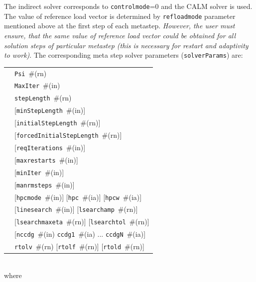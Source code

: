 \documentclass[a4paper]{article}
\makeatletter
\newcommand{\param}[1]{\texttt{#1}} %
\newcommand{\optional}[1]{[#1]} %
\newcommand{\field}[2]{\param{#1}~\#{\tiny(#2)}} %
\newcommand{\optField}[2]{\optional{\field{#1}{#2}}}
\newenvironment{record}[1][]{\begin{tabular}{|ll}}{\end{tabular}\\}
\newcommand{\recentry}[2]{{#1}&{#2}\\}
\newcounter{rcc}
\newenvironment{record}[1][\textwidth]{\setcounter{rcc}{0}\begin{tabular*}{#1}{|ll@{\extracolsep{\fill}}r}}{\end{tabular*}\\}
\newcommand{\recentry}[2]{\ifthenelse{\value{rcc}>0}{&$\backslash$ \\}{\setcounter{rcc}{1}}{#1}&{#2}}
\makeatother
\begin{document}
The indirect solver corresponds to \param{controlmode}=0 and the CALM
solver is used. The value of reference load vector is determined by
\param{refloadmode} parameter mentioned above at the first step of
each metastep. {\em However, the user must ensure, that the same value of
reference load vector could be obtained for all solution steps of
particular metastep (this is necessary for restart and adaptivity to work)}.
The corresponding meta step solver parameters (\param{solverParams}) are:\\
\begin{record}
  \recentry{\hspace{10mm}}{\field{Psi}{rn}}
  \recentry{}{\field{MaxIter}{in}}
  \recentry{}{\field{stepLength}{rn}}
  \recentry{}{\optField{min\-Step\-Le\-ngth}{in}}
  \recentry{}{\optField{initialStepLength}{rn}}
  \recentry{}{\optField{forcedInitialStepLength}{rn}}
  \recentry{}{\optField{reqIterations}{in}}
  \recentry{}{\optField{maxrestarts}{in}}
  \recentry{}{\optField{minIter}{in}}
  \recentry{}{\optField{manrmsteps}{in}}
  \recentry{}{\optField{hpcmode}{in} \optField{hpc}{ia} \optField{hpcw}{ia}}
  \recentry{}{\optField{linesearch}{in} \optField{lsearchamp}{rn}}
  \recentry{}{\optField{lsearchmaxeta}{rn} \optField{lsearchtol}{rn}}
  \recentry{}{\optional{\field{nccdg}{in} \field{ccdg1}{ia} ... \field{ccdgN}{ia}}}
  \recentry{}{\field{rtolv}{rn} \optField{rtolf}{rn} \optField{rtold}{rn}}
\end{record}
where
\end{document}
